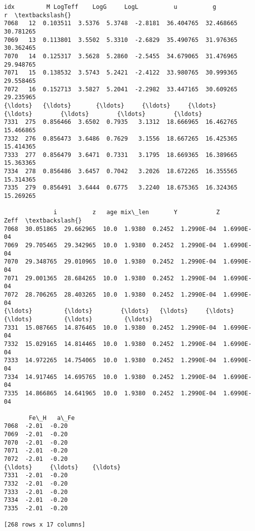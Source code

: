 \documentclass[11pt]{article}
\makeatletter
\newcommand{\boxspacing}{\kern\kvtcb@left@rule\kern\kvtcb@boxsep}
\newcommand{\prompt}[4]{
        {\ttfamily\llap{{\color{#2}[#3]:\hspace{3pt}#4}}\vspace{-\baselineskip}}
    }
\makeatother
\begin{document}
            \begin{tcolorbox}[breakable, size=fbox, boxrule=.5pt, pad at break*=1mm, opacityfill=0]
\prompt{Out}{outcolor}{8}{\boxspacing}
\begin{Verbatim}[commandchars=\\\{\}]
      idx         M LogTeff    LogG     LogL          u          g          r  \textbackslash{}
7068   12  0.103511  3.5376  5.3748  -2.8181  36.404765  32.468665  30.781265
7069   13  0.113801  3.5502  5.3310  -2.6829  35.490765  31.976365  30.362465
7070   14  0.125317  3.5628  5.2860  -2.5455  34.679065  31.476965  29.948765
7071   15  0.138532  3.5743  5.2421  -2.4122  33.980765  30.999365  29.558465
7072   16  0.152713  3.5827  5.2041  -2.2982  33.447165  30.609265  29.235965
{\ldots}   {\ldots}       {\ldots}     {\ldots}     {\ldots}      {\ldots}        {\ldots}        {\ldots}        {\ldots}
7331  275  0.856466  3.6502  0.7935   3.1312  18.666965  16.462765  15.466865
7332  276  0.856473  3.6486  0.7629   3.1556  18.667265  16.425365  15.414365
7333  277  0.856479  3.6471  0.7331   3.1795  18.669365  16.389665  15.363365
7334  278  0.856486  3.6457  0.7042   3.2026  18.672265  16.355565  15.314365
7335  279  0.856491  3.6444  0.6775   3.2240  18.675365  16.324365  15.269265

              i          z   age mix\_len       Y           Z        Zeff  \textbackslash{}
7068  30.051865  29.662965  10.0  1.9380  0.2452  1.2990E-04  1.6990E-04
7069  29.705465  29.342965  10.0  1.9380  0.2452  1.2990E-04  1.6990E-04
7070  29.348765  29.010965  10.0  1.9380  0.2452  1.2990E-04  1.6990E-04
7071  29.001365  28.684265  10.0  1.9380  0.2452  1.2990E-04  1.6990E-04
7072  28.706265  28.403265  10.0  1.9380  0.2452  1.2990E-04  1.6990E-04
{\ldots}         {\ldots}        {\ldots}   {\ldots}     {\ldots}     {\ldots}         {\ldots}         {\ldots}
7331  15.087665  14.876465  10.0  1.9380  0.2452  1.2990E-04  1.6990E-04
7332  15.029165  14.814465  10.0  1.9380  0.2452  1.2990E-04  1.6990E-04
7333  14.972265  14.754065  10.0  1.9380  0.2452  1.2990E-04  1.6990E-04
7334  14.917465  14.695765  10.0  1.9380  0.2452  1.2990E-04  1.6990E-04
7335  14.866865  14.641965  10.0  1.9380  0.2452  1.2990E-04  1.6990E-04

       Fe\_H   a\_Fe
7068  -2.01  -0.20
7069  -2.01  -0.20
7070  -2.01  -0.20
7071  -2.01  -0.20
7072  -2.01  -0.20
{\ldots}     {\ldots}    {\ldots}
7331  -2.01  -0.20
7332  -2.01  -0.20
7333  -2.01  -0.20
7334  -2.01  -0.20
7335  -2.01  -0.20

[268 rows x 17 columns]
\end{Verbatim}
\end{tcolorbox}
        
\end{document}
